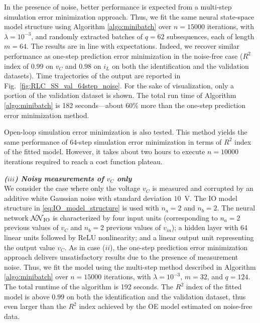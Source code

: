 \documentclass{article}
\newcommand{\NN}{\mathcal{N\!N}} %
\newcommand{\numiter}{n}
\begin{document}
In the presence of noise, better performance is expected from a multi-step simulation error minimization approach. Thus, we fit the same neural state-space model structure using Algorithm \ref{algo:minibatch} over $\numiter=15000$ iterations, with $\lambda=10^{-3}$, and  randomly extracted batches of $q=62$ subsequences, each of length $m=64$.    
The results are in line with expectations. Indeed, we recover similar performance as one-step prediction error minimization in the noise-free case ($R^2$ index of $0.99$ on $v_C$ and $0.98$ on $i_L$ on both the identification and the validation datasets). Time trajectories of the output  are reported in Fig.~\ref{fig:RLC_SS_val_64step_noise}. For the sake of visualization, only a portion of the validation dataset is shown.   
The total run time of Algorithm \ref{algo:minibatch} is 182 seconds---about 60\% more than the one-step prediction error minimization method. 

Open-loop simulation error minimization is also tested. This method yields the same performance of $64$-step simulation error minimization in terms of $R^2$ index of the fitted model. However, it takes about two hours to execute $\numiter=10000$ iterations required to reach a cost function plateau.



\emph{\bf{($iii$) Noisy measurements of $v_C$ only}}
\ \\
We consider the  case where only the voltage $v_{C}$ is measured and corrupted by an additive white Gaussian noise with standard deviation $10$~V.  The IO model structure in \eqref{eq:IO_model_structure} is used with $n_a=2$ and $n_b=2$. The neural network $\NN_{\rm IO}$ is characterized by four input units (corresponding to $n_a=2$ previous values of $v_C$ and $n_b=2$ previous values of $v_{in}$);  a  hidden layer with 64 linear units followed by  ReLU nonlinearity; and a linear output unit representing the output  value $v_C$. 
As in case ($ii$), the one-step prediction error minimization approach delivers  unsatisfactory results due to the presence of measurement noise. 
Thus, we fit the model using the multi-step method described in Algorithm \ref{algo:minibatch} over $\numiter=15000$ iterations, with $\lambda=10^{-3}$, $m=32$, and $q=124$.
The total runtime of the algorithm is 192 seconds.
The $R^2$ index of the fitted model is above  $0.99$ on both the identification and the validation dataset, thus even larger than the $R^2$ index achieved by the OE model estimated on noise-free data.
\end{document}
